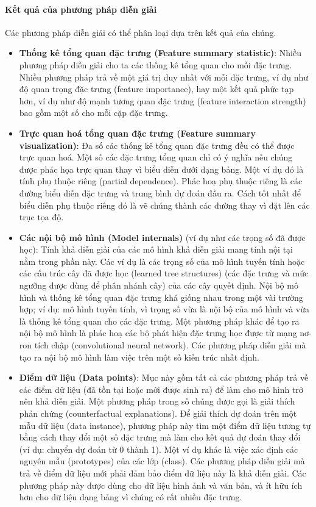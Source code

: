 \paragraph{Kết quả của phương pháp diễn giải} Các phương pháp diễn giải có thể phân loại dựa trên kết quả của chúng.

\begin{itemize}
\item \textbf{Thống kê tổng quan đặc trưng (Feature summary statistic)}: Nhiều phương pháp diễn giải cho ta các thống kê tổng quan cho mỗi đặc trưng. Nhiều phương pháp trả về một giá trị duy nhất với mỗi đặc trưng, ví dụ như độ quan trọng đặc trưng (feature importance), hay một kết quả phức tạp hơn, ví dụ như độ mạnh tương quan đặc trưng (feature interaction strength) bao gồm một số cho mỗi cặp đặc trưng.

\item \textbf{Trực quan hoá tổng quan đặc trưng (Feature summary visualization)}: Đa số các thống kê tổng quan đặc trưng đều có thể được trực quan hoá. Một số các đặc trưng tổng quan chỉ có ý nghĩa nếu chúng được phác họa trực quan thay vì biểu diễn dưới dạng bảng. Một ví dụ đó là tính phụ thuộc riêng (partial dependence). Phác hoạ phụ thuộc riêng là các đường biểu diễn đặc trưng và trung bình dự đoán đầu ra. Cách tốt nhất để biểu diễn phụ thuộc riêng đó là vẽ chúng thành các đường thay vì đặt lên các trục tọa độ.

\item \textbf{Các nội bộ mô hình (Model internals)} (ví dụ như các trọng số đã được học): Tính khả diễn giải của các mô hình khả diễn giải mang tính nội tại nằm trong phần này. Các ví dụ là các trọng số của mô hình tuyến tính hoặc các cấu trúc cây đã được học (learned tree structures) (các đặc trưng và mức ngưỡng được dùng để phân nhánh cây) của các cây quyết định. Nội bộ mô hình và thống kê tổng quan đặc trưng khá giống nhau trong một vài trường hợp; ví dụ: mô hình tuyến tính, vì trọng số vừa là nội bộ của mô hình và vừa là thống kê tổng quan cho các đặc trưng. Một phương pháp khác để tạo ra nội bộ mô hình là phác hoạ các bộ phát hiện đặc trưng học được từ mạng nơ-ron tích chập (convolutional neural network). Các phương pháp diễn giải mà tạo ra nội bộ mô hình làm việc trên một số kiến trúc nhất định.

\item \textbf{Điểm dữ liệu (Data points)}: Mục này gồm tất cả các phương pháp trả về các điểm dữ liệu (đã tồn tại hoặc mới được sinh ra) để làm cho mô hình trở nên khả diễn giải. Một phương pháp trong số chúng được gọi là giải thích phản chứng (counterfactual explanations). Để giải thích dự đoán trên một mẫu dữ liệu (data instance), phương pháp này tìm một điểm dữ liệu tương tự bằng cách thay đổi một số đặc trưng mà làm cho kết quả dự đoán thay đổi (ví dụ: chuyển dự đoán từ 0 thành 1). Một ví dụ khác là việc xác định các nguyên mẫu (prototypes) của các lớp (class). Các phương pháp diễn giải mà trả về điểm dữ liệu mới phải đảm bảo điểm dữ liệu này là khả diễn giải. Các phương pháp này được dùng cho dữ liệu hình ảnh và văn bản, và ít hữu ích hơn cho dữ liệu dạng bảng vì chúng có rất nhiều đặc trưng.


\end{itemize}
